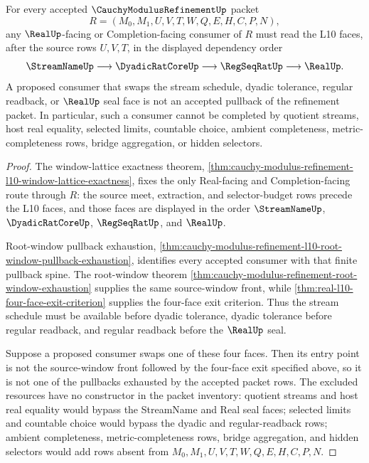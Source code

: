 \begin{theorem}
\label{thm:cauchy-modulus-refinement-l10-face-order-rigidity}
For every accepted $\CauchyModulusRefinementUp$ packet
$$
R=(M_0,M_1,U,V,T,W,Q,E,H,C,P,N),
$$
any $\RealUp$-facing or Completion-facing consumer of $R$ must read the L10 faces, after the source rows $U,V,T$, in the displayed dependency order
$$
\StreamNameUp \longrightarrow \DyadicRatCoreUp \longrightarrow \RegSeqRatUp \longrightarrow \RealUp.
$$
A proposed consumer that swaps the stream schedule, dyadic tolerance, regular readback, or $\RealUp$ seal face is not an accepted pullback of the refinement packet. In particular, such a consumer cannot be completed by quotient streams, host real equality, selected limits, countable choice, ambient completeness, metric-completeness rows, bridge aggregation, or hidden selectors.
\end{theorem}
\begin{proof}
The window-lattice exactness theorem, \autoref{thm:cauchy-modulus-refinement-l10-window-lattice-exactness}, fixes the only Real-facing and Completion-facing route through $R$: the source meet, extraction, and selector-budget rows precede the L10 faces, and those faces are displayed in the order $\StreamNameUp$, $\DyadicRatCoreUp$, $\RegSeqRatUp$, and $\RealUp$.

Root-window pullback exhaustion, \autoref{thm:cauchy-modulus-refinement-l10-root-window-pullback-exhaustion}, identifies every accepted consumer with that finite pullback spine. The root-window theorem \autoref{thm:cauchy-modulus-refinement-root-window-exhaustion} supplies the same source-window front, while \autoref{thm:real-l10-four-face-exit-criterion} supplies the four-face exit criterion. Thus the stream schedule must be available before dyadic tolerance, dyadic tolerance before regular readback, and regular readback before the $\RealUp$ seal.

Suppose a proposed consumer swaps one of these four faces. Then its entry point is not the source-window front followed by the four-face exit specified above, so it is not one of the pullbacks exhausted by the accepted packet rows. The excluded resources have no constructor in the packet inventory: quotient streams and host real equality would bypass the StreamName and Real seal faces; selected limits and countable choice would bypass the dyadic and regular-readback rows; ambient completeness, metric-completeness rows, bridge aggregation, and hidden selectors would add rows absent from $M_0,M_1,U,V,T,W,Q,E,H,C,P,N$.
\end{proof}

